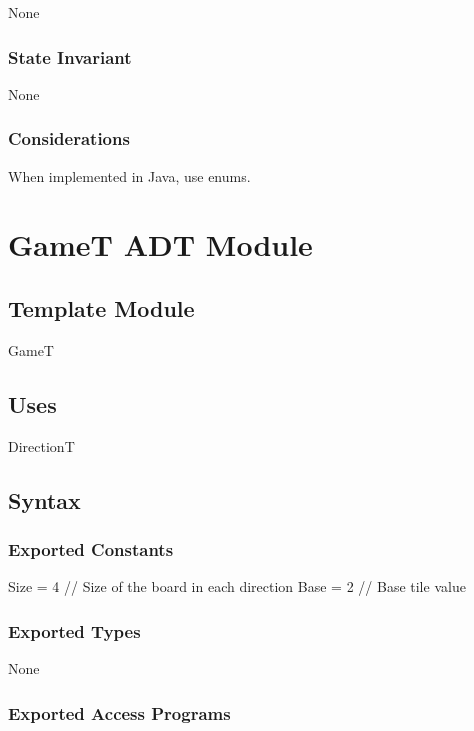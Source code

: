 \documentclass[12pt]{article}
\begin{document}
None

\subsubsection* {State Invariant}

None

\subsubsection* {Considerations}

When implemented in Java, use enums.

\newpage

\section* {GameT ADT Module}

\subsection*{Template Module}

GameT

\subsection* {Uses}

DirectionT

\subsection* {Syntax}

\subsubsection* {Exported Constants}

Size = 4  // Size of the board in each direction
Base = 2  // Base tile value

\subsubsection* {Exported Types}

None

\subsubsection* {Exported Access Programs}
\end{document}
